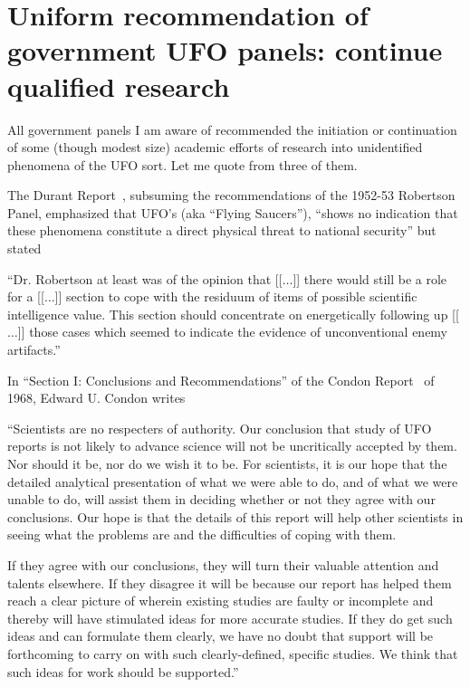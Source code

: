 \section{Uniform recommendation of government UFO panels: continue qualified research}

All government panels I am aware of recommended the initiation or continuation of some
(though modest size) academic efforts of research into unidentified phenomena of the UFO sort.
Let me quote from three of them.

The Durant Report~\cite{RobertsonPanelDurantReport}, subsuming the recommendations of the 1952-53 Robertson Panel,
emphasized that UFO's (aka ``Flying Saucers''),  ``shows no indication that these phenomena constitute a direct physical threat to national security''
but stated
\begin{svgraybox}
``Dr. Robertson at least was of the opinion that [[$\ldots$]] there would still be a role for a [[$\ldots$]] section
to cope with the residuum of items of possible scientific intelligence value.
This section should concentrate on energetically following up [[$\ldots$]]
those cases which seemed to indicate the evidence of unconventional enemy artifacts.''
\end{svgraybox}




In  ``Section I: Conclusions and Recommendations'' of the Condon Report~\cite{Condon-report,Condon-report-Bantam,Condon-report-Dutton,BibEntry2023Jan} of 1968,
Edward U. Condon writes
\begin{svgraybox}
``Scientists are no respecters of authority. Our conclusion that study of UFO reports is not likely to advance science will not be
uncritically accepted by them. Nor should it be, nor do we wish it to be. For scientists, it is our hope that the detailed analytical
presentation of what we were able to do, and of what we were unable to do, will assist them in deciding whether or not they agree with
our conclusions. Our hope is that the details of this report will help other scientists in seeing what the problems are and the difficulties
of coping with them.

If they agree with our conclusions, they will turn their valuable attention and talents elsewhere. If they disagree it will be because
our report has helped them reach a clear picture of wherein existing studies are faulty or incomplete and thereby will have stimulated
ideas for more accurate studies. If they do get such ideas and can formulate them clearly, we have no doubt that support will be
forthcoming to carry on with such clearly-defined, specific studies. We think that such ideas for work should be supported.''
\end{svgraybox}


